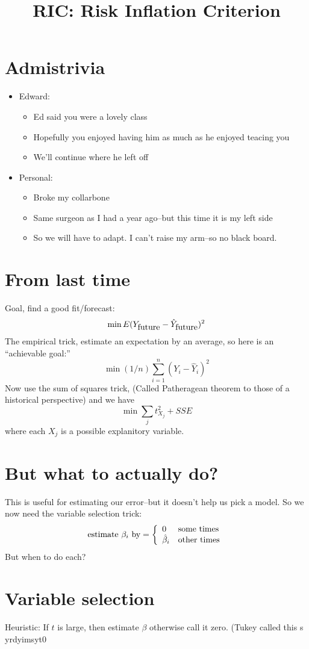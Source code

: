\documentclass[14pt]{extarticle}
\begin{document}
\title{RIC: Risk Inflation Criterion}

\section{Admistrivia}
\begin{itemize}
\item Edward:
\begin{itemize}
\item Ed said you were a lovely class
\item Hopefully you enjoyed having him as much as he enjoyed teacing you
\item We'll continue where he left off
\end{itemize}
\item Personal:
\begin{itemize}
\item Broke my collarbone
\item Same surgeon as I had a year ago--but this time it is my left side
\item So we will have to adapt.  I can't raise my arm--so no black board.
\end{itemize}
\end{itemize}
\section{From last time}
Goal, find a good fit/forecast:
\begin{displaymath}
\min E(Y_{\hbox{future}} - \hat{Y}_{\hbox{future}})^2
\end{displaymath}
The empirical trick, estimate an expectation by an average, so here is an
``achievable goal:''
\begin{displaymath}
\min (1/n)\sum_{i=1}^n(Y_i - \hat{Y}_i)^2
\end{displaymath}
Now use the sum of squares trick, (Called Patheragean theorem to those
of a historical perspective) and we have
\begin{displaymath}
\min \sum_j t^2_{X_j} + SSE
\end{displaymath}
where each $X_j$ is a possible explanitory variable.
\section{But what to actually do?}
This is useful for estimating our error--but it doesn't help us pick a
model.  So we now need the variable selection trick:
\begin{displaymath}
\hbox{estimate $\beta_i$ by} = \left\{ 
\begin{array}{l@{\quad}l}
0 & \hbox{some times}\\
\hat\beta_i & \hbox{other times}
\end{array}
\right.
\end{displaymath}
But when to do each?

\section{Variable selection}
Heuristic: If $t$ is large, then estimate $\beta$ otherwise call it
zero.  (Tukey called this s yrdyimsyt0
\end{document}
